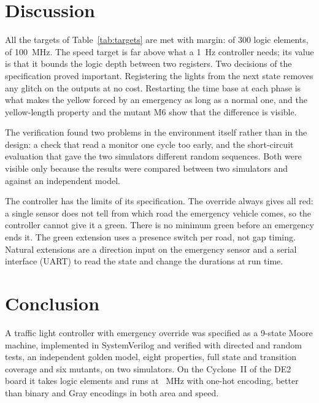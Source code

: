 \documentclass[conference]{IEEEtran}
\begin{document}
\section{Discussion}\label{sec:disc}

All the targets of Table~\ref{tab:targets} are met with margin: \LEtotal{} of 300
logic elements, \FmaxSlow{} of 100~MHz. The speed target is far above what a
1~Hz controller needs; its value is that it bounds the logic depth between two
registers. Two decisions of the specification proved important. Registering the
lights from the next state removes any glitch on the outputs at no cost. Restarting
the time base at each phase is what makes the yellow forced by an emergency as
long as a normal one, and the yellow-length property and the mutant M6 show that
the difference is visible.

The verification found two problems in the environment itself rather than in the
design: a check that read a monitor one cycle too early, and the
short-circuit evaluation that gave the two simulators different random
sequences. Both were visible only because the results were compared between two
simulators and against an independent model.

The controller has the limits of its specification. The override always gives
all red: a single sensor does not tell from which road the emergency vehicle
comes, so the controller cannot give it a green. There is no minimum green before
an emergency ends it. The green extension uses a presence switch per road, not
gap timing. Natural extensions are a direction input on the emergency sensor and a
serial interface (UART) to read the state and change the durations at run time.

\section{Conclusion}

A traffic light controller with emergency override was specified as a 9-state
Moore machine, implemented in SystemVerilog and verified with directed and random
tests, an independent golden model, eight properties, full state and transition
coverage and six mutants, on two simulators. On the Cyclone~II of the DE2 board it
takes \LEtotal{} logic elements and runs at \FmaxSlow~MHz with one-hot encoding,
better than binary and Gray encodings in both area and speed.
\end{document}
